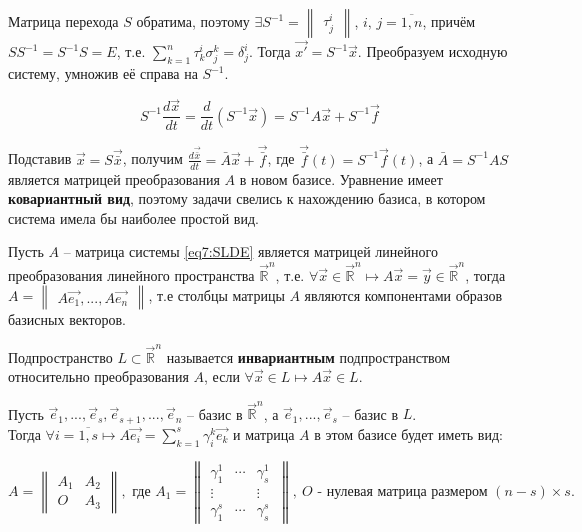 Матрица перехода $S$ обратима, поэтому $\exists S^{-1} = \begin{Vmatrix} \tau_j^i \end{Vmatrix}$, $i,\,j = \overline{1, n}$, причём $SS^{-1} = S^{-1}S = E$, 
т.е. $\sum \limits_{k = 1}^n \tau_k^i \sigma_j^k = \delta_j^i$. Тогда $\vec{x'} = S^{-1}\vec{x}$.
Преобразуем исходную систему, умножив её справа на $S^{-1}$.

\[ S^{-1} \frac{d\vec{x}}{dt} = \frac{d}{dt} (S^{-1}\vec{x}) = S^{-1}A\vec{x} + S^{-1}\vec{f}\]

Подставив $\vec x = S \vec{\bar{x}}$, получим $\frac{d\vec{\bar{x}}}{dt} = \bar{A} \vec{x} + \vec{\bar{f}}$, где $\vec{\bar{f}}(t) = S^{-1}\vec{f}(t)$, 
а $\bar{A} = S^{-1}AS$ является матрицей преобразования $A$ в новом базисе. Уравнение имеет \textbf{ковариантный вид}, поэтому задачи свелись к нахождению базиса, в котором система имела бы наиболее простой вид.

Пусть $A$ -- матрица системы \eqref{eq7:SLDE} является матрицей линейного преобразования линейного пространства $\vec{\mathbb{R}}^n$, 
т.е. $\forall \vec{x} \in \vec{\mathbb{R}}^n \mapsto A\vec{x} = \vec{y} \in \vec{\mathbb{R}}^n$, тогда $A = \begin{Vmatrix} A\vec{e_1}, ..., A\vec{e_n} \end{Vmatrix}$, 
т.е столбцы матрицы $A$ являются компонентами образов базисных векторов.


\begin{definition}
    Подпространство $L \subset \vec{\mathbb{R}}^n$ называется \textbf{инвариантным} подпространством относительно преобразования $A$, если $\forall \vec{x} \in L \mapsto A \vec{x} \in L$.
\end{definition}

Пусть $\vec{e}_1, ..., \vec{e}_s, \vec{e}_{s+1}, ..., \vec{e}_n$ -- базис в $\vec{\mathbb{R}}^n$, а $\vec{e}_1, ..., \vec{e}_s$ -- базис в $L$. \\
Тогда $\forall i = \overline{1, s} \mapsto A\vec{e_i} = \sum\limits_{k=1}^s \gamma_i^k \vec{e_k}$ и матрица $A$ в этом базисе будет иметь вид:

\[ A = \begin{Vmatrix} A_1 & A_2 \\ O & A_3 \end{Vmatrix}, \text{ где } A_1 = \begin{Vmatrix} \gamma_1^1 & \cdots & \gamma_s^1 \\ \vdots & & \vdots \\ \gamma_1^s &\cdots & \gamma_s^s\ \end{Vmatrix}, ~O \text{ - нулевая матрица размером } (n - s) \times s. \]

